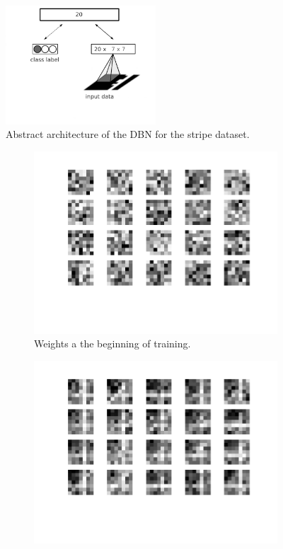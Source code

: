 \begin{figure}[h!]
	\centering
    	\includegraphics[width=0.5\textwidth]{imgs/dbn_stripe1.png} 
    \caption{Abstract architecture of the DBN for the stripe dataset.}
	\label{fig:dbnstrarch}
\end{figure}


\begin{figure}[h!]
	\centering
	\begin{subfigure}[t]{.4\textwidth}
  		\centering
  		\includegraphics[width=.85\linewidth]{imgs/7x7/w1.png}
  		\caption{Weights a the beginning of training.}
  		\label{fig:sub1}
	\end{subfigure}%
	\begin{subfigure}[t]{.4\textwidth}
  		\centering
  		\includegraphics[width=.85\linewidth]{imgs/7x7/w2.png}

\end{subfigure}
\end{figure}
